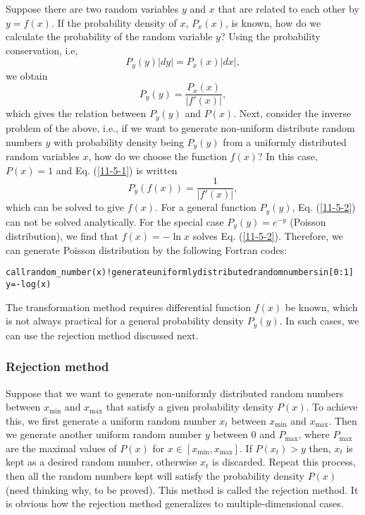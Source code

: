 \documentclass{article}
\newenvironment{tmcode}[1][]{\begin{alltt} }{\end{alltt}}
\begin{document}
Suppose there are two random variables $y$ and $x$ that are related to each
other by $y = f (x)$. If the probability density of $x$, $P_x (x)$, is known,
how do we calculate the probability of the random variable $y$? Using the
probability conservation, i.e,
\begin{equation}
  P_y (y) |d y| = P_x (x) |d x|,
\end{equation}
we obtain
\begin{equation}
  \label{11-5-1} P_y (y) = \frac{P_x (x)}{|f' (x) |},
\end{equation}
which gives the relation between $P_y (y)$ and $P (x)$. Next, consider the
inverse problem of the above, i.e., if we want to generate non-uniform
distribute random numbers $y$ with probability density being $P_y (y)$ from a
uniformly distributed random variables $x$, how do we choose the function $f
(x)$? In this case, $P (x) = 1$ and Eq. (\ref{11-5-1}) is written
\begin{equation}
  \label{11-5-2} P_y (f (x)) = \frac{1}{|f' (x) |},
\end{equation}
which can be solved to give $f (x)$. For a general function $P_y (y)$, Eq.
(\ref{11-5-2}) can not be solved analytically. For the special case $P_y (y) =
e^{- y}$ (Poisson distribution), we find that $f (x) = - \ln x$ solves Eq.
(\ref{11-5-2}). Therefore, we can generate Poisson distribution by the
following Fortran codes:
\begin{tmcode}
call random_number(x) !generate uniformly distributed random numbers in [0:1]
y=-log(x)
\end{tmcode}
The transformation method requires differential function $f (x)$ be known,
which is not always practical for a general probability density $P_y (y)$. In
such cases, we can use the rejection method discussed next.

\subsubsection{Rejection method}

Suppose that we want to generate non-uniformly distributed random numbers
between $x_{\min}$ and $x_{\max}$ that satisfy a given probability density $P
(x)$. To achieve this, we first generate a uniform random number $x_t$ between
$x_{\min}$ and $x_{\max}$. Then we generate another uniform random number $y$
between 0 and $P_{\max}$, where $P_{\max}$ are the maximal values of $P (x)$
for $x \in [x_{\min}, x_{\max}]$. If $P (x_t) > y$ then, $x_t$ is kept as a
desired random number, otherwise $x_t$ is discarded. Repeat this process, then
all the random numbers kept will satisfy the probability density $P (x)$ (need
thinking why, to be proved). This method is called the rejection method. It is
obvious how the rejection method generalizes to multiple-dimensional cases.
\end{document}
